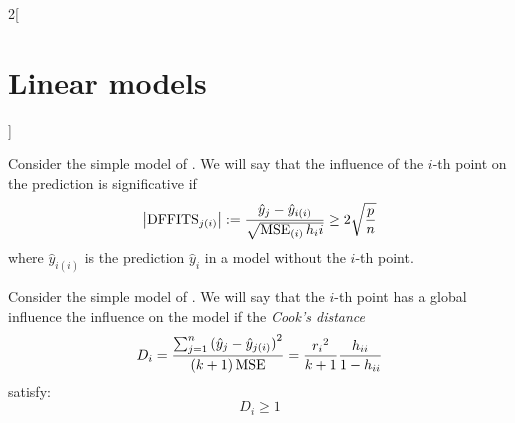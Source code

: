 \documentclass[../../../main_math.tex]{subfiles}
\begin{document}
\begin{multicols}{2}[\section{Linear models}]
\begin{definition}
  \end{definition}
  \begin{definition}
    Consider the simple model of . We will say that the influence of the $i$-th point on the prediction is significative if $$\abs{\mathrm{DFFITS}_{j(i)}}:=\frac{\hat{y}_j-\hat{y}_{i(i)}}{\sqrt{\operatorname{MSE}_{(i)}h_ii}}\geq 2\sqrt{\frac{p}{n}}$$ where $\hat{y}_{i(i)}$ is the prediction $\hat{y}_{i}$ in a model without the $i$-th point.
  \end{definition}
  \begin{definition}
    Consider the simple model of . We will say that the $i$-th point has a global influence the influence on the model if the \emph{Cook's distance} $$D_i=\frac{\sum_{j=1}^n{(\hat{y}_j-\hat{y}_{j(i)})}^2}{(k+1)\operatorname{MSE}}=\frac{{r_i}^2}{k+1}\frac{h_{ii}}{1-h_{ii}}$$ satisfy: $$D_i\geq 1$$
  \end{definition}

\end{multicols}
\end{document}
